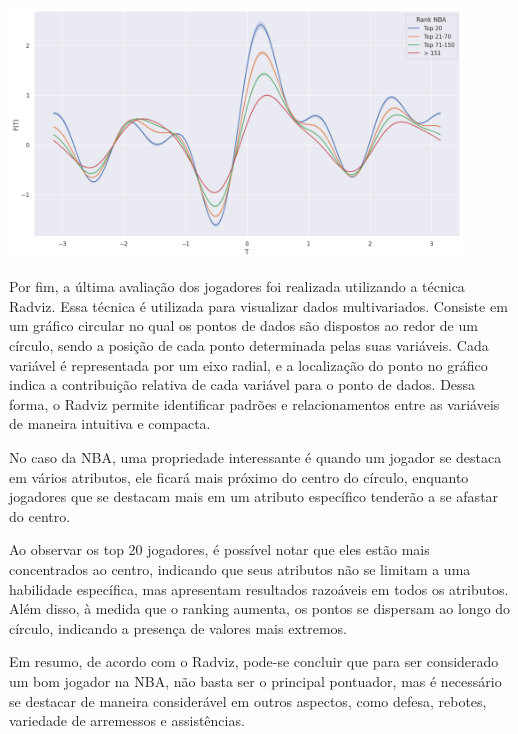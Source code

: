 \documentclass[
]{book}
\begin{document}
\includegraphics[width=0.9\textwidth,height=\textheight]{imagens/7.png}

Por fim, a última avaliação dos jogadores foi realizada utilizando a técnica Radviz. Essa técnica é utilizada para visualizar dados multivariados. Consiste em um gráfico circular no qual os pontos de dados são dispostos ao redor de um círculo, sendo a posição de cada ponto determinada pelas suas variáveis. Cada variável é representada por um eixo radial, e a localização do ponto no gráfico indica a contribuição relativa de cada variável para o ponto de dados. Dessa forma, o Radviz permite identificar padrões e relacionamentos entre as variáveis de maneira intuitiva e compacta.

No caso da NBA, uma propriedade interessante é quando um jogador se destaca em vários atributos, ele ficará mais próximo do centro do círculo, enquanto jogadores que se destacam mais em um atributo específico tenderão a se afastar do centro.

Ao observar os top 20 jogadores, é possível notar que eles estão mais concentrados ao centro, indicando que seus atributos não se limitam a uma habilidade específica, mas apresentam resultados razoáveis em todos os atributos. Além disso, à medida que o ranking aumenta, os pontos se dispersam ao longo do círculo, indicando a presença de valores mais extremos.

Em resumo, de acordo com o Radviz, pode-se concluir que para ser considerado um bom jogador na NBA, não basta ser o principal pontuador, mas é necessário se destacar de maneira considerável em outros aspectos, como defesa, rebotes, variedade de arremessos e assistências.
\end{document}
